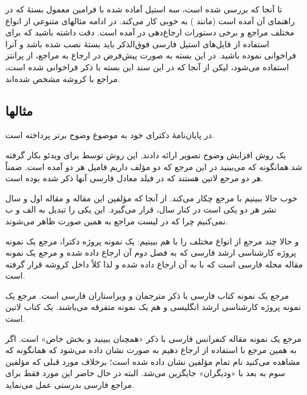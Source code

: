 \documentclass{article}
\theoremstyle{plain}\newtheorem{question}{پرسش}
\begin{document}
تا آنجا که بررسی شده است، سه استیل آماده شده با فرامین معمول بستهٔ  که در راهنمای آن آمده است (مانند ) به خوبی کار می‌کند. در ادامه مثالهای متنوعی از انواع مختلف مراجع و برخی دستورات ارجاع‌دهی در  آمده است. دقت داشته باشید که  برای استفاده از فایل‌های استیل فارسی فوق‌الذکر باید بستهٔ  نصب شده باشد و آنرا فراخوانی نموده باشید. در این بسته به صورت پیش‌فرض در ارجاع به مراجع، از پرانتز استفاده می‌شود، لیکن از آنجا که در این سند این بسته با ذکر \lr{[square]} فراخوانی شده است، مراجع با کروشه مشخص شده‌اند. 

\subsection{مثالها}

\citet{Borman04thesis} در پایان‌نامهٔ دکترای خود به موضوع وضوح برتر پرداخته است.

\citet{Amintoosi09precise} یک روش افزایش وضوح تصویر ارائه دادند. این روش توسط \citet{Amintoosi09video} برای ویدئو بکار گرفته شد.همانگونه که می‌بینید در این مرجع که دو مؤلف داریم فامیل هر دو آمده است. ضمناً هر دو مرجع لاتین هستند که در فیلد  معادل فارسی آنها ذکر شده بوده است.

خوب حالا ببینیم با مرجع \citep{Amintoosi09regional} چکار می‌کند. از آنجا که مؤلفین این مقاله و مقاله اول و سال نشر هر دو یکی است در کنار سال،  قرار می‌گیرد. این یکی را تبدیل به الف و ب نمی‌کنیم چرا که در لیست مراجع به همین صورت ظاهر می‌شوند.

و حالا چند مرجع از انواع مختلف  را با هم ببینیم:  \citet{Omidali82phdThesis} یک نمونه پروژه دکترا، مرجع \citet[فصل ۲]{Pourmousa88mscThesis} یک نمونه پروژه کارشناسی ارشد فارسی که به فصل دوم آن ارجاع داده شده و  مرجع \citep{Vahedi87} یک نمونه مقاله مجله فارسی است که با  به آن ارجاع داده شده و لذا کلاً داخل کروشه قرار گرفته است.

مرجع \citep{Pedram80osool} یک نمونه کتاب فارسی با ذکر مترجمان و ویراستاران فارسی است. مرجع \citep{Khalighi07MscThesis}  یک نمونه پروژه کارشناسی ارشد انگلیسی و \citet{Khalighi87xepersian} هم یک نمونه متفرقه  می‌باشند.\citet{Gonzalez02book} یک کتاب لاتین است.

 مرجع \citet[همچنین ببینید][بخش ۲]{Amintoosi87afzayesh}  یک نمونه  مقاله کنفرانس فارسی با ذکر «همچنان ببینید و بخش خاص» است. اگر به همین مرجع با استفاده از  ارجاع دهیم به صورت \citealp*{Amintoosi87afzayesh} نشان داده می‌شود که همانگونه که مشاهده می‌کنید نام تمام مؤلفین نشان داده شده است؛ برخلاف مورد قبلی که مؤلفین سوم به بعد با «ودیگران» جایگزین می‌شد. البته در حال حاضر این مورد فقط برای مراجع فارسی بدرستی عمل می‌نماید. 
\end{document}
